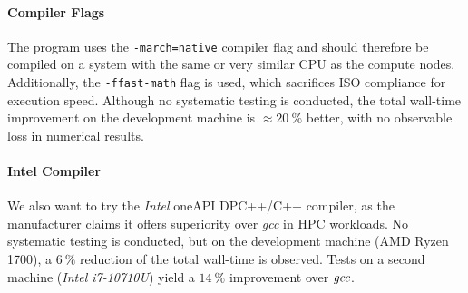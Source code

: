 	\paragraph{Compiler Flags}
		The program uses the \texttt{-march=native} compiler flag and should therefore be compiled on a system with the same or very similar CPU as the compute nodes. Additionally, the \texttt{-ffast-math} flag is used, which sacrifices ISO compliance for execution speed. Although no systematic testing is conducted, the total wall-time improvement on the development machine is $\approx \SI{20}{\percent}$ better, with no observable loss in numerical results. 
	
	\paragraph{Intel Compiler}
		We also want to try the \emph{Intel\textsuperscript{\tiny\textregistered}} oneAPI DPC++/C++ compiler, as the manufacturer claims it offers superiority over \emph{gcc} in HPC workloads. No systematic testing is conducted, but on the development machine (AMD Ryzen 1700), a $\SI{6}{\percent}$ reduction of the total wall-time is observed. Tests on a second machine (\emph{Intel\textsuperscript{\tiny\textregistered} i7-10710U}) yield a $\SI{14}{\percent}$ improvement over $\emph{gcc}$.
			
	


	